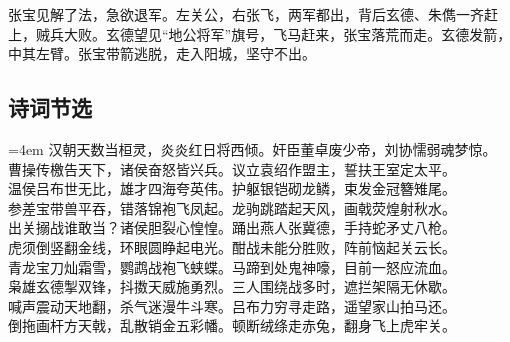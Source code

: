         张宝见解了法，急欲退军。左关公，右张飞，两军都出，背后玄德、朱儁一齐赶上，贼兵大败。玄德望见“地公将军”旗号，飞马赶来，张宝落荒而走。玄德发箭，中其左臂。张宝带箭逃脱，走入阳城，坚守不出。
        \subsection{诗词节选}
            \hangindent=4em 汉朝天数当桓灵，炎炎红日将西倾。奸臣董卓废少帝，刘协懦弱魂梦惊。\\
            曹操传檄告天下，诸侯奋怒皆兴兵。议立袁绍作盟主，誓扶王室定太平。\\
            温侯吕布世无比，雄才四海夸英伟。护躯银铠砌龙鳞，束发金冠簪雉尾。\\
            参差宝带兽平吞，错落锦袍飞凤起。龙驹跳踏起天风，画戟荧煌射秋水。\\
            出关搦战谁敢当？诸侯胆裂心惶惶。踊出燕人张冀德，手持蛇矛丈八枪。\\
            虎须倒竖翻金线，环眼圆睁起电光。酣战未能分胜败，阵前恼起关云长。\\
            青龙宝刀灿霜雪，鹦鹉战袍飞蛱蝶。马蹄到处鬼神嚎，目前一怒应流血。\\
            枭雄玄德掣双锋，抖擞天威施勇烈。三人围绕战多时，遮拦架隔无休歇。\\
            喊声震动天地翻，杀气迷漫牛斗寒。吕布力穷寻走路，遥望家山拍马还。\\
            倒拖画杆方天戟，乱散销金五彩幡。顿断绒绦走赤兔，翻身飞上虎牢关。
